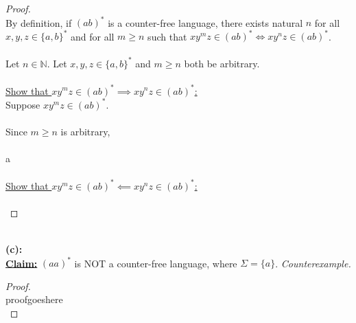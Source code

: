 \documentclass[12pt]{article}
\begin{document}
\begin{proof}
\leavevmode\\
    By definition, if $(ab)^*$ is a counter-free language, there exists natural $n$ for all $x, y, z \in \{ a, b \}^*$ and for all $m \geq n$ such that $xy^mz \in (ab)^* \iff xy^nz \in (ab)^*$. \\
    \\
    Let $n \in \mathbb{N}$. Let $x, y, z \in \{ a, b \}^*$ and $m \geq n$ both be arbitrary. \\
    \\
    \underline{Show that $xy^mz \in (ab)^* \implies xy^nz \in (ab)^*$:} \\
    Suppose $xy^mz \in (ab)^*$. \\
    \\
    Since $m \geq n$ is arbitrary,  \\
    \\
    a \\
    \\
    \underline{Show that $xy^mz \in (ab)^* \impliedby xy^nz \in (ab)^*$:} \\
    \\
\end{proof}
\leavevmode\\
\textbf{(c):} \\
\textbf{\underline{Claim:}} $(aa)^*$ is NOT a counter-free language, where $\Sigma = \{ a \} $. 
\textit{Counterexample.} \\
\begin{proof}
\leavevmode\\
    proofgoeshere \\
\end{proof}
\pagebreak
\end{document}
